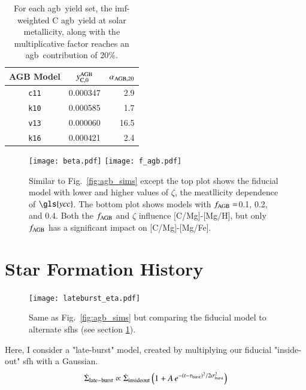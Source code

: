\documentclass[12pt,oneside,letterpaper]{report}
\newcommand{\agb}{\gls{agb}}
\newcommand{\sfh}{\gls{sfh}}
\newcommand{\imf}{\gls{imf}}
\newcommand{\cxi}{\texttt{\gls{c11}}}
\newcommand{\kx}{\texttt{\gls{k10}}}
\newcommand{\kxvi}{\texttt{\gls{k16}}}
\newcommand{\vxiii}{\texttt{\gls{v13}}}
\newcommand{\Ycc}{\gls{ycc}}
\newcommand{\caah}{[C/Mg]-[Mg/H]}
\newcommand{\caafe}{[C/Mg]-[Mg/Fe]}
\begin{document}
\begin{table}
	\centering
    \caption[Low mass star solar C yields]{For each \agb\ yield set, the \imf-weighted C \agb\ yield at solar metallicity, along with the multiplicative factor reaches an \agb\ contribution of 20\%.}
	\label{tab:alpha_agb}
	\begin{tabular}{ccr} %
		\toprule 
		AGB Model & $y_{\rm C, 0}^{\rm AGB}$ & $\alpha_{\rm AGB, 20}$\\
        \midrule
        \cxi & 0.000347 & 2.9\\
        \kx & 0.000585 & 1.7\\
        \vxiii & 0.000060 & 16.5\\
        \kxvi & 0.000421 & 2.4\\
		\bottomrule
	\end{tabular}
\end{table}


\begin{figure}[htp]
\centering
\texttt{[image: beta.pdf]}
\texttt{[image: f\_agb.pdf]}

\caption[Adjusted yield models]{Similar to Fig.~\ref{fig:agb_sims} except the top plot shows the fiducial model with lower and higher values of $\zeta$, the meatllicity dependence of $\Ycc$. The bottom plot shows models with $f_{\rm AGB}=$0.1, 0.2, and 0.4. Both the $f_{\rm AGB}$ and $\zeta$ influence \caah, but only $f_{\rm AGB}$ has a significant impact on \caafe.}
\label{fig:beta_f}
\end{figure}



\section{Star Formation History} \label{sec:sfh}


\begin{figure}[htp]
\centering
\texttt{[image: lateburst\_eta.pdf]}

\caption[Lateburst models]{Same as Fig.~\ref{fig:agb_sims} but comparing the fiducial model to alternate \sfh{}s (see section  \ref{sec:sfh}).}
\label{fig:sfh_models}

\end{figure}


Here, I consider a "late-burst" model, created by multiplying our fiducial "inside-out" \sfh{} with a Gaussian.
\begin{equation}\label{eq:lateburst}
    \dot{\Sigma}_{\rm late-burst} \propto \dot{\Sigma}_{\rm insideout} \left(1 + A\,e^{-(t-\tau_{\rm burst})^2/2\sigma^2_{\rm burst}} \right)
\end{equation}
\end{document}
